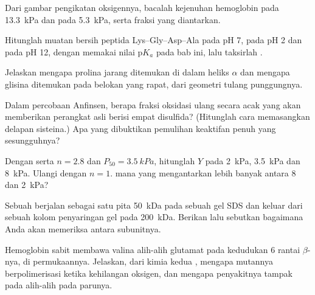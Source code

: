 \begin{exercise}[$\star$]\label{exo:b1:proteins:4}
Dari gambar pengikatan oksigennya, bacalah kejenuhan hemoglobin pada
\qty{13.3}{kPa} dan pada \qty{5.3}{kPa}, serta fraksi yang diantarkan.
\end{exercise}

\begin{exercise}[$\star\star$]\label{exo:b1:proteins:5}
Hitunglah muatan bersih peptida Lys--Gly--Asp--Ala pada pH 7, pada pH 2
dan pada pH 12, dengan memakai nilai p$K_a$ pada bab ini, lalu taksirlah
.
\end{exercise}

\begin{exercise}[$\star\star$]\label{exo:b1:proteins:6}
Jelaskan mengapa prolina jarang ditemukan di dalam heliks $\alpha$ dan
mengapa glisina ditemukan pada belokan yang rapat, dari geometri tulang
punggungnya.
\end{exercise}

\begin{exercise}[$\star\star$]\label{exo:b1:proteins:7}
Dalam percobaan Anfinsen, berapa fraksi oksidasi ulang secara acak yang
akan memberikan perangkat asli berisi empat disulfida? (Hitunglah cara
memasangkan delapan sisteina.) Apa yang dibuktikan pemulihan
keaktifan penuh yang sesungguhnya?
\end{exercise}

\begin{exercise}[$\star\star$]\label{exo:b1:proteins:8}
Dengan  serta $n = 2.8$ dan $P_{50} = \qty{3.5}{kPa}$,
hitunglah $Y$ pada \qty{2}{kPa}, \qty{3.5}{kPa} dan \qty{8}{kPa}.
Ulangi dengan $n = 1$.  mana yang mengantarkan lebih banyak
antara \qty{8}{} dan
\qty{2}{kPa}?
\end{exercise}

\begin{exercise}[$\star\star$]\label{exo:b1:proteins:9}
Sebuah  berjalan sebagai satu pita \qty{50}{kDa} pada sebuah gel
SDS dan keluar dari sebuah kolom penyaringan gel pada \qty{200}{kDa}.
Berikan  lalu sebutkan bagaimana Anda akan
memeriksa  antara subunitnya.
\end{exercise}

\begin{exercise}[$\star\star\star$]\label{exo:b1:proteins:10}
Hemoglobin  sabit membawa valina alih-alih glutamat pada kedudukan 6
rantai $\beta$-nya, di permukaannya. Jelaskan, dari kimia kedua , mengapa  mutannya berpolimerisasi ketika kehilangan
oksigen, dan mengapa penyakitnya tampak pada  alih-alih pada
parunya.
\end{exercise}

